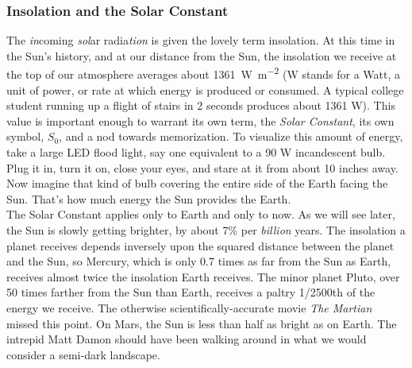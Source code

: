 \documentclass[amstex,12pt]{book}
\begin{document}
\subsubsection{Insolation and the Solar Constant}
The \textit{in}coming \textit{sol}ar radia\textit{tion} is given the lovely term insolation. At this time in the Sun's history, and at our distance from the Sun, the insolation we receive at the top of our atmosphere averages about \SI{1361} {\watt\per\metre^2} (W stands for a Watt, a unit of power, or rate at which energy is produced or consumed. A typical college student running up a flight of stairs in 2 seconds produces about 1361 W). This value is important enough to warrant its own term, the \emph{Solar Constant}, its own symbol, $S_0$, and a nod towards memorization. To visualize this amount of energy, take a large LED flood light, say one equivalent to a 90 W incandescent bulb. Plug it in, turn it on, close your eyes, and stare at it from about 10 inches away.  Now imagine that kind of bulb covering the entire side of the Earth facing the Sun. That’s how much energy the Sun provides the Earth.\\
The Solar Constant applies only to Earth and only to now. As we will see later, the Sun is slowly getting brighter, by about 7\% per \textit{billion} years. The insolation a planet receives depends inversely upon the squared distance between the planet and the Sun, so Mercury, which is only 0.7 times as far from the Sun as Earth, receives almost twice the insolation Earth receives. The minor planet Pluto, over 50 times farther from the Sun than Earth, receives a paltry 1/2500th of the energy we receive. The otherwise scientifically-accurate movie \textit{The Martian} missed this point. On Mars, the Sun is less than half as bright as on Earth. The intrepid Matt Damon should have been walking around in what we would consider a semi-dark landscape.
\end{document}
